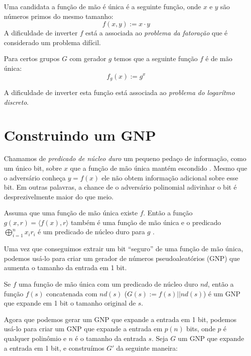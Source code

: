 \begin{example}
  Uma candidata a função de mão é única é a seguinte função, onde $x$ e $y$ são números primos do mesmo tamanho:
  \begin{displaymath}
    f(x,y) := x \cdot y
  \end{displaymath}
  A dificuldade de inverter $f$ está a associada ao {\em problema da fatoração} que é considerado um problema difícil.

  Para certos grupos $G$ com gerador $g$ temos que a seguinte função $f$ é de mão única:
  \begin{displaymath}
    f_g(x) := g^x
  \end{displaymath}

A dificuldade de inverter esta função está associada ao {\em problema do logarítmo discreto}.
\end{example}

\section{Construindo um GNP}

Chamamos de {\em predicado de núcleo duro} um pequeno pedaço de informação, como um único bit, sobre $x$ que a função de mão única mantém escondido \cite{Blum84}.
Mesmo que o adversário conheça $y = f(x)$ ele não obtem informação adicional sobre esse bit.
Em outras palavras, a chance de o adversário polinomial adivinhar o bit é desprezivelmente maior do que meio.

\begin{theorem}
  Assuma que uma função de mão única existe $f$.
  Então a função $g(x,r) = \langle f(x), r \rangle$ também é uma função de mão única e o predicado $\bigoplus_{i=1}^nx_ir_i$ é um predicado de núcleo duro para $g$ \cite{Goldreich89}.
\end{theorem}

Uma vez que conseguimos extrair um bit ``seguro'' de uma função de mão única, podemos usá-lo para criar um gerador de números pseudoaleatórios (GNP) que aumenta o tamanho da entrada em 1 bit.

\begin{theorem}
  Se $f$ uma função de mão única com um predicado de núcleo duro $nd$, então a função $f(s)$ concatenada com $nd(s)$ ($G(s) := f(s)||nd(s)$) é um GNP que expande em 1 bit o tamanho original de $s$.
\end{theorem}

Agora que podemos gerar um GNP que expande a entrada em 1 bit, podemos usá-lo para criar um GNP que expande a entrada em $p(n)$ bits, onde $p$ é qualquer polinômio e $n$ é o tamanho da entrada $s$.
Seja $G$ um GNP que expande a entrada em 1 bit, e construímos $G'$ da seguinte maneira:

